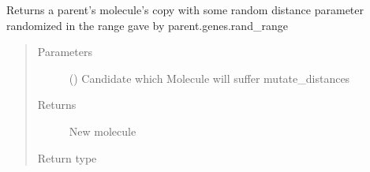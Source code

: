 \documentclass[letterpaper,10pt,english]{sphinxmanual}
\begin{document}
\begin{fulllineitems}

\begin{fulllineitems}
\label{\detokenize{MolOpt:MolOpt.MolOpt.MolOpt.mutate_distances}}
\sphinxAtStartPar
Returns a parent’s molecule’s copy with some random distance parameter randomized in the range gave by 
parent.genes.rand\_range
\begin{quote}\begin{description}
\item[{Parameters}] \leavevmode
\sphinxAtStartPar
{} ({\hyperref[\detokenize{MolOpt.genetic:MolOpt.genetic.genetic.Chromosome}]{}}) \textendash{} Candidate which Molecule will suffer mutate\_distances

\item[{Returns}] \leavevmode
\sphinxAtStartPar
New molecule

\item[{Return type}] \leavevmode
\sphinxAtStartPar
{\hyperref[\detokenize{MolOpt.molecular:MolOpt.molecular.molecular.Molecule}]{}}

\end{description}\end{quote}

\end{fulllineitems}



\end{fulllineitems}
\end{document}
